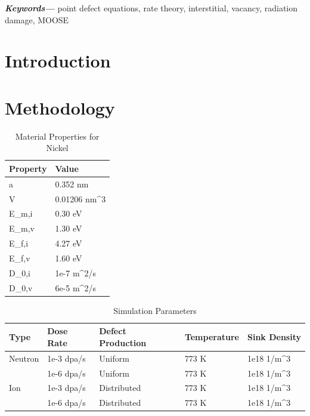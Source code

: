 \documentclass[a4paper]{article}
\providecommand{\keywords}[1]
{
  \small
  \textbf{\textit{Keywords---}} #1
}
\begin{document}
\keywords{point defect equations, rate theory, interstitial, vacancy, radiation damage, MOOSE}

% 


\section{Introduction} \hspace{10pt}

\section{Methodology} \hspace{10pt}

\begin{table}[h!]
  \centering
  \caption{Material Properties for Nickel\cite{walgraef1996}}
  \label{table:Ni_material_properties}
  \begin{tabular}{ ||p{2cm}|p{2cm}||  }
     \hline
     Property & Value\\
     \hline\hline
     a  & 0.352 nm\\
     V  & 0.01206 nm^3\\
     E_{m,i}  & 0.30 eV\\
     E_{m,v}  & 1.30 eV\\
     E_{f,i}  & 4.27 eV\\
     E_{f,v}  & 1.60 eV\\
     D_{0,i}  & 1e-7 m^2/s\\
     D_{0,v}  & 6e-5 m^2/s\\

     \hline
  \end{tabular}
\end{table}

\begin{table}[h!]
  \centering
  \caption{Simulation Parameters}
  \label{table:simulation_parameters}
  \begin{tabular}{ ||p{2cm}|p{2cm}|p{3cm}|p{2cm}|p{2cm}||  }
     \hline
     Type & Dose Rate & Defect Production & Temperature & Sink Density\\
     \hline
     \hline
     Neutron  & 1e-3 dpa/s  & Uniform     & 773 K & 1e18 1/m^{3}\\
              & 1e-6 dpa/s  & Uniform     & 773 K & 1e18 1/m^{3}\\
     \hline
     Ion      & 1e-3 dpa/s  & Distributed & 773 K & 1e18 1/m^{3}\\
              & 1e-6 dpa/s  & Distributed & 773 K & 1e18 1/m^{3}\\
     \hline
  \end{tabular}
\end{table}
\end{document}
